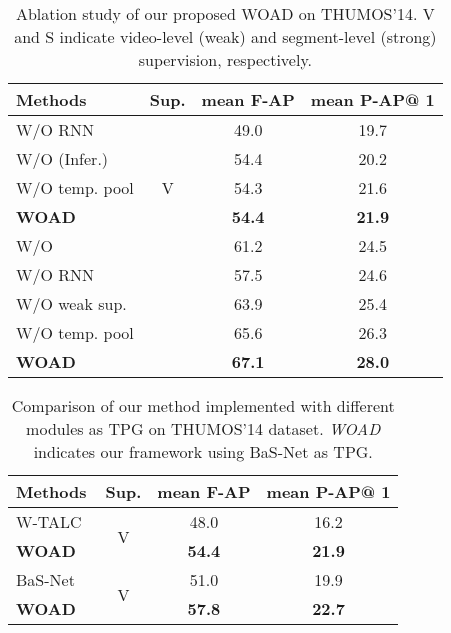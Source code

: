 \documentclass[final]{cvpr}
\begin{document}
\begin{table}[htbp]
    \centering
    \begin{tabular}{l|c||c|c}
        Methods & Sup. & mean F-AP & mean P-AP@ 1\\
        \midrule
        W/O RNN& \multirow{5}{*}{V}& 49.0& 19.7 \\
        W/O  (Infer.)&  & 54.4&20.2 \\
        W/O temp. pool & &54.3 &21.6 \\
        \textbf{WOAD}& & \textbf{54.4}& \textbf{21.9} \\
        \midrule
        \midrule
        W/O  & \multirow{5}{*}{S} & 61.2&24.5 \\
        W/O RNN & & 57.5& 24.6 \\
        W/O weak sup. &  &63.9 &25.4 \\
        W/O temp. pool & & 65.6&26.3 \\
        \textbf{WOAD} & & \textbf{67.1}& \textbf{28.0} \\
    \end{tabular}
    \caption{Ablation study of our proposed WOAD on THUMOS'14. V and S indicate video-level (weak) and segment-level (strong) supervision, respectively.}
    \label{tab: thumos_ablation}
\end{table}
\begin{table}[htbp]
    \centering
    \begin{tabular}{l|c||c|c}
        Methods & Sup. &mean F-AP & mean P-AP@ 1\\
        \midrule
         W-TALC~\cite{paul2018w} &\multirow{2}{*}{V} &48.0& 16.2 \\
        \textbf{WOAD} & &\textbf{54.4}& \textbf{21.9} \\
        \midrule
        \midrule
        BaS-Net~\cite{lee2020background} & \multirow{2}{*}{V}&51.0& 19.9 \\
        \textbf{WOAD} & &\textbf{57.8}& \textbf{22.7} \\
    \end{tabular}
    \caption{Comparison of our method implemented with different modules as TPG on THUMOS'14 dataset. \emph{WOAD} indicates our framework using BaS-Net as TPG.}
    \label{tab: offline_weak_detection}
\end{table}
\end{document}
